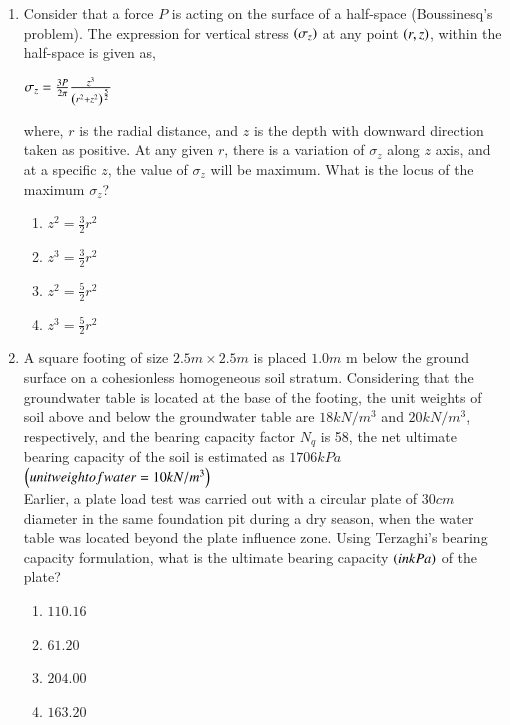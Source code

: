 \documentclass{exam}
\begin{document}
\begin{enumerate}
\item Consider that a force $P$ is acting on the surface of a half-space (Boussinesq’s problem). The expression for vertical stress $\left(\sigma_z\right)$ at any point $\left(r,z\right)$, within the half-space is given as,
\vspace{0.1cm}
\begin{center}
    \Large$\sigma_z=\frac{3P}{2\pi}\frac{z^3}{\left(r^2+z^2\right)^\frac{5}{2}}$
\end{center}
where, $r$ is the radial distance, and $z$ is the depth with downward direction taken as positive. At any given $r$, there is a variation of $\sigma_z$ along $z$ axis, and at a specific $z$, the value of $\sigma_z$ will be maximum. What is the locus of the maximum $\sigma_z$?
\begin{enumerate}
    \item $z^2=\frac{3}{2}r^2$
    \item $z^3=\frac{3}{2}r^2$
    \item $z^2=\frac{5}{2}r^2$
    \item $z^3=\frac{5}{2}r^2$
\end{enumerate}
\vspace{0.5cm}

\item A square footing of size $2.5m\times2.5m$ is placed $1.0m$ m below the ground surface on a cohesionless homogeneous soil stratum. Considering that the groundwater table is located at the base of the footing, the unit weights of soil above and below the groundwater table are $18kN/m^3$ and $20kN/m^3$, respectively, and the bearing capacity factor $N_q$ is 58, the net ultimate bearing capacity of the soil is estimated as $1706kPa$ $\left(unit weight of water=10kN/m^3\right)$\\
Earlier, a plate load test was carried out with a circular plate of $30cm$ diameter in the same foundation pit during a dry season, when the water table was located beyond the plate influence zone. Using Terzaghi’s bearing capacity formulation, what is the ultimate bearing capacity $\left(in kPa\right)$ of the plate?
\begin{enumerate}
    \item $110.16$
    \item $61.20$
    \item $204.00$
    \item $163.20$
\end{enumerate}
\vspace{0.5cm}


\end{enumerate}
\end{document}
